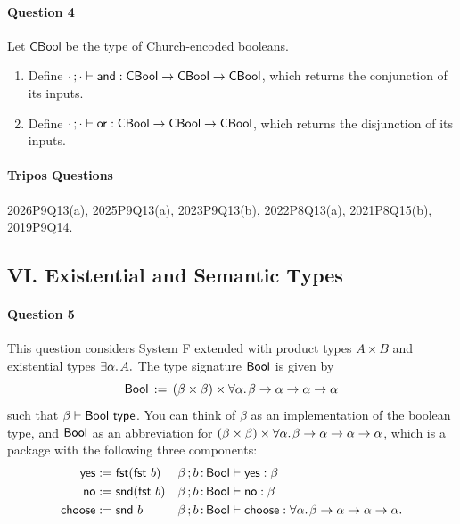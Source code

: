 \documentclass[11pt,a4paper,twoside]{article}
\begin{document}
\paragraph{Question 4} Let $\mathsf{CBool}$ be the type of
Church-encoded booleans.

\begin{enumerate}[label=(\alph*)]
  \item Define $\cdot\, ; \cdot \vdash \mathsf{and} : \mathsf{CBool} \to
    \mathsf{CBool} \to \mathsf{CBool}$,
    which returns the conjunction of its inputs.

  \item Define $\cdot\, ; \cdot \vdash \mathsf{or} : \mathsf{CBool} \to
    \mathsf{CBool} \to \mathsf{CBool}$,
    which returns the disjunction of its inputs.
\end{enumerate}

\paragraph{Tripos Questions} 2026P9Q13(a), 2025P9Q13(a), 2023P9Q13(b), 2022P8Q13(a),
2021P8Q15(b), 2019P9Q14.

\subsection*{VI. Existential and Semantic Types}

\paragraph{Question 5} This question considers System F extended with
product types $A \times B$ and existential types $\exists \alpha .\;\! A.$
The type signature $\mathsf{Bool}$ is given by
\[ \mathsf{Bool} \,:=\, (\beta \times \beta) \times \forall \alpha .\;\! \beta \to
\alpha \to \alpha \to \alpha \]
such that $\beta \vdash \mathsf{Bool}\ \mathsf{type}$.
You can think of $\beta$ as an implementation of the boolean type,
and $\mathsf{Bool}$ as an abbreviation for
$(\beta \times \beta) \times \forall \alpha .\;\! \beta \to \alpha \to
\alpha \to \alpha$,
which is a package with the following three components:
\begin{align*}
  \mathsf{yes}    & := \mathsf{fst}(\mathsf{fst}\ b) & \beta \, ; b \,{:}\, \mathsf{Bool} &
  \vdash \mathsf{yes} : \beta \\
  \mathsf{no}     & := \mathsf{snd}(\mathsf{fst}\ b) & \beta \, ; b \,{:}\, \mathsf{Bool} &
  \vdash \mathsf{no} : \beta \\
  \mathsf{choose}    & := \mathsf{snd}\ b       & \beta \, ; b \,{:}\, \mathsf{Bool} &
  \vdash \mathsf{choose} : \forall \alpha .\;\! \beta \to \alpha \to \alpha \to \alpha.
\end{align*}
\end{document}
